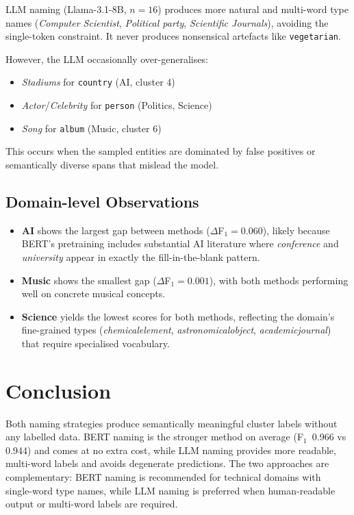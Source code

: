 \documentclass[11pt,a4paper]{article}
\begin{document}
LLM naming (Llama-3.1-8B, $n=16$) produces more natural and
multi-word type names (\textit{Computer Scientist},
\textit{Political party}, \textit{Scientific Journals}), avoiding the
single-token constraint. It never produces nonsensical artefacts like
\texttt{vegetarian}.

However, the LLM occasionally over-generalises:
\begin{itemize}[leftmargin=1.5em]
  \item \textit{Stadiums} for \texttt{country} (AI, cluster 4)
  \item \textit{Actor}/\textit{Celebrity} for \texttt{person} (Politics,
    Science)
  \item \textit{Song} for \texttt{album} (Music, cluster 6)
\end{itemize}
This occurs when the sampled entities are dominated by false positives or
semantically diverse spans that mislead the model.

\subsection{Domain-level Observations}

\begin{itemize}[leftmargin=1.5em]
  \item \textbf{AI} shows the largest gap between methods
    ($\Delta$F$_1 = 0.060$), likely because BERT's pretraining includes
    substantial AI literature where \textit{conference} and
    \textit{university} appear in exactly the fill-in-the-blank pattern.
  \item \textbf{Music} shows the smallest gap ($\Delta$F$_1 = 0.001$),
    with both methods performing well on concrete musical concepts.
  \item \textbf{Science} yields the lowest scores for both methods,
    reflecting the domain's fine-grained types
    (\textit{chemicalelement}, \textit{astronomicalobject},
    \textit{academicjournal}) that require specialised vocabulary.
\end{itemize}

\section{Conclusion}

Both naming strategies produce semantically meaningful cluster labels
without any labelled data. BERT naming is the stronger method
on average (F$_1$~0.966 vs 0.944) and comes at no extra cost, while LLM
naming provides more readable, multi-word labels and avoids degenerate
predictions. The two approaches are complementary: BERT naming is
recommended for technical domains with single-word type names, while
LLM naming is preferred when human-readable output or multi-word labels
are required.
\end{document}
